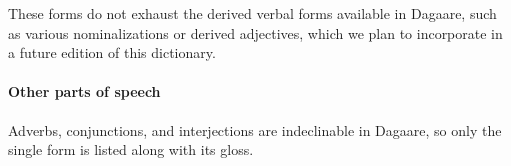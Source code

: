 \begin{refsection}
These forms do not exhaust the derived verbal forms available in Dagaare, such as various nominalizations or derived adjectives, which we plan to incorporate in a future edition of this dictionary.

\paragraph*{Other parts of speech}

Adverbs, conjunctions, and interjections are indeclinable in Dagaare, so only the single form is listed along with its gloss.







\printbibliography[heading=subbibliography]
\end{refsection}

